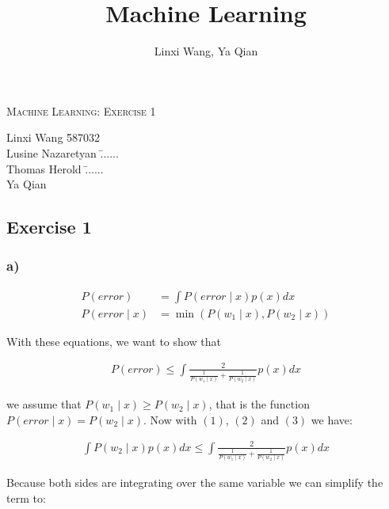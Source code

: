 \documentclass[10pt,a4paper]{article}
\author{Linxi Wang, Ya Qian}
\title{Machine Learning}
\begin{document}
\begin{center}
\Large{\textsc{Machine Learning: Exercise 1}} \\
\end{center}

\begin{tabbing}
Linxi Wang \hspace{0.9cm}\= 587032\\
Lusine Nazaretyan \hspace{0.9cm}\= ......\\
Thomas Herold \hspace{0.9cm}\= ......\\ 
Ya Qian
\end{tabbing}

\subsection*{Exercise 1}
\subsubsection*{a)}
\begin{align}
	P(error) &= \int P(error\mid x)p(x) dx \label{eq1} \\
	P(error\mid x) &= \min (P(w_1\mid x), P(w_2\mid x)) \label{eq2}
\end{align}

With these equations, we want to show that

\begin{align}
	P(error) \le \int \frac{2}{\frac{1}{P(w_1\mid x)} + \frac{1}{P(w_2 \mid x)}} p(x) dx \label{eq3}
\end{align}

we assume that $P(w_1 \mid x) \ge P(w_2 \mid x) \label{ass1}$, that is the function $P(error \mid x) = P(w_2 \mid x)$. Now with $(1)$, $(2)$ and $(3)$ we have:

\begin{align*}
	\int P(w_2 \mid x)p(x) dx \le \int \frac{2}{\frac{1}{P(w_1\mid x)} + \frac{1}{P(w_2 \mid x)}} p(x) dx
\end{align*}

Because both sides are integrating over the same variable we can simplify the term to:
\end{document}
